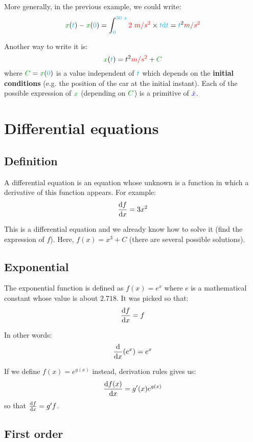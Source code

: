 More generally, in the previous example, we could write:
\[
\dist{x}(\delay{t}) - \dist{x}(\delay{0})
= \int_{\delay{0}}^{\delay{30~s}} \accel{2~m/s^2} \times \delay{t} \delay{\dt}
= \delay{t}^2 \accel{m/s^2}
\]

Another way to write it is:
\[
\dist{x}(\delay{t})
= t^2 \accel{m/s^2} + \dist{C}
\]
where $\dist{C} = \dist{x}(\delay{0})$ is a value independent of
$\textcolor{cyan}{t}$ which depends on the \textbf{initial conditions} (e.g. the
position of the car at the initial instant). Each of the possible
expression of $\dist{x}$ (depending on $\dist{C}$) is a primitive of
$\textcolor{blue}{\dot x}$.



\section{Differential equations}


\subsection{Definition}

A differential equation is an equation whose unknown is a function in
which a derivative of this function appears. For example:
\[
\frac {\mathrm{d} f} {\mathrm{d} x} = 3x^2
\]

This is a differential equation and we already know how to solve it
(find the expression of $f$). Here, $f(x) = x^3 + C$ (there are several
possible solutions).


\subsection{Exponential}

The exponential function is defined as $f(x) = e^x$ where $e$ is a
mathematical constant whose value is about $2.718$. It was picked so that:
\[
\frac {\mathrm{d} f} {\mathrm{d} x} = f
\]

In other words:
\[
\frac {\mathrm{d}} {\mathrm{d} x} (e^x) = e^x
\]

\begin{remark}
If we define $f(x) = e^{g(x)}$ instead, derivation rules
gives us:
\[
\frac {\mathrm{d} f(x)} {\mathrm{d} x}
= g'(x) e^{g(x)}
\]
so that $\frac {\mathrm{d} f} {\mathrm{d} x} = g' f$.
\end{remark}


\subsection{First order}

